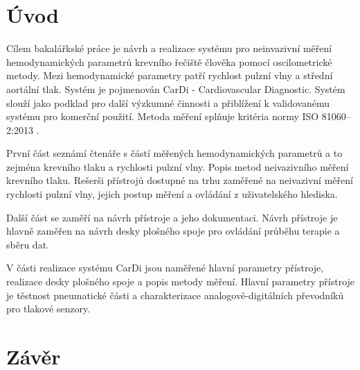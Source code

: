 \documentclass{ctuthesis}
\begin{document}
\maketitle



\chapter{Úvod}
Cílem bakalářkské práce je návrh a realizace systému pro neinvazivní měření hemodynamických parametrů krevního řečiště člověka pomocí oscilometrické metody. Mezi hemodynamické parametry patří rychlost pulzní vlny a střední aortální tlak.
Systém je pojmenován CarDi - Cardiovascular Diagnostic. Systém slouží jako podklad pro další výzkumné činnosti a přiblížení k validovanému systému pro komerční použití. Metoda měření splňuje kritéria normy ISO 81060–2:2013 \cite{cite:Validation}.

\par
První část seznámí čtenáře s částí měřených hemodynamických parametrů a to zejména krevního tlaku a rychlosti pulzní vlny. Popis metod neivazivního měření krevního tlaku. Rešerši přístrojů dostupné na trhu zaměřené na neivazivní měření rychlosti pulzní vlny, jejich postup měření a ovládání z uživatelského hlediska.
\par
Další část se zaměří na návrh přístroje a jeho dokumentaci. Návrh přístroje je hlavně zaměřen na návrh desky plošného spoje pro ovládání průběhu terapie a sběru dat.
\par
V části realizace systému CarDi jsou naměřené hlavní parametry přístroje, realizace desky plošného spoje a popis metody měření. Hlavní parametry přístroje je těstnost pneumatické části a charakterizace analogově-digitálních převodníků pro tlakové senzory.









\chapter{Závěr}

\appendix

\printindex


\nocite{*}




\end{document}
